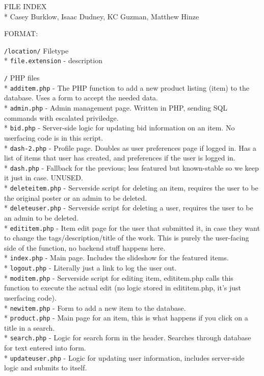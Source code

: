 \documentclass[11pt]{article}
\begin{document}
{\Huge FILE INDEX}\\*
Casey Burklow, Isaac Dudney, KC Guzman, Matthew Hinze

FORMAT:

\texttt{/location/} Filetype\\*
\texttt{file.extension} - description
\vspace{4em}

\texttt{/} PHP files\\*
\texttt{additem.php} - The PHP function to add a new product listing (item) to the database. Uses a form to accept the needed data.\\*
\texttt{admin.php} - Admin management page. Written in PHP, sending SQL commands with escalated priviledge.\\*
\texttt{bid.php} - Server-side logic for updating bid information on an item. No userfacing code is in this script.\\*
\texttt{dash-2.php} - Profile page. Doubles as user preferences page if logged in. Has a list of items that user has created, and preferences if the user is logged in.\\*
\texttt{dash.php} - Fallback for the previous; less featured but known-stable so we keep it just in case. UNUSED.\\*
\texttt{deleteitem.php} - Serverside script for deleting an item, requires the user to be the original poster or an admin to be deleted.\\*
\texttt{deleteuser.php} - Serverside script for deleting a user, requires the user to be an admin to be deleted.\\*
\texttt{edititem.php} - Item edit page for the user that submitted it, in case they want to change the tags/description/title of the work. This is purely the user-facing side of the function, no backend stuff happens here.\\*
\texttt{index.php} - Main page. Includes the slideshow for the featured items.\\*
\texttt{logout.php} - Literally just a link to log the user out.\\*
\texttt{moditem.php} - Serverside script for editing item, edititem.php calls this function to execute the actual edit (no logic stored in edititem.php, it's just userfacing code).\\*
\texttt{newitem.php} - Form to add a new item to the database.\\*
\texttt{product.php} - Main page for an item, this is what happens if you click on a title in a search.\\*
\texttt{search.php} - Logic for search form in the header. Searches through database for text entered into form.\\*
\texttt{updateuser.php} - Logic for updating user information, includes server-side logic and submits to itself.
\end{document}
